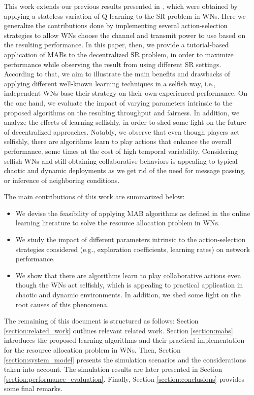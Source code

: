 \documentclass[preprint,12pt]{elsarticle}
\begin{document}
This work extends our previous results presented in \cite{wilhelmi2017implications}, which were obtained by applying a stateless variation of Q-learning to the SR problem in WNs. Here we generalize the contributions done by implementing several action-selection strategies to allow WNs choose the channel and transmit power to use based on the resulting performance. In this paper, then, we provide a tutorial-based application of MABs to the decentralized SR problem, in order to maximize performance while observing the result from using different SR settings. According to that, we aim to illustrate the main benefits and drawbacks of applying different well-known learning techniques in a selfish way, i.e., independent WNs base their strategy on their own experienced performance. On the one hand, we evaluate the impact of varying parameters intrinsic to the proposed algorithms on the resulting throughput and fairness. In addition, we analyze the effects of learning selfishly, in order to shed some light on the future of decentralized approaches. Notably, we observe that even though players act selfishly, there are algorithms %
learn to play actions that enhance the overall performance, some times at the cost of high temporal variability. Considering selfish WNs and still obtaining collaborative behaviors is appealing to typical chaotic and dynamic deployments as we get rid of the need for message passing, or inference of neighboring conditions. 

The main contributions of this work are summarized below:
\begin{itemize}		
	\item We devise the feasibility of applying MAB algorithms as defined in the online learning literature to solve the resource allocation problem in WNs.
	\item We study the impact of different parameters intrinsic to the action-selection strategies considered (e.g., exploration coefficients, learning rates) on network performance.
	\item We show that there are algorithms learn to play collaborative actions even though the WNs act selfishly, which is appealing to practical application in chaotic and dynamic environments. In addition, we shed some light on the root causes of this phenomena. 
\end{itemize}

The remaining of this document is structured as follows: Section \ref{section:related_work} outlines relevant related work. Section \ref{section:mabs} introduces the proposed learning algorithms and their practical implementation for the resource allocation problem in WNs. Then, Section \ref{section:system_model} presents the simulation scenarios and the considerations taken into account. The simulation results are later presented in Section \ref{section:performance_evaluation}. Finally, Section \ref{section:conclusions} provides some final remarks.
	
\end{document}
